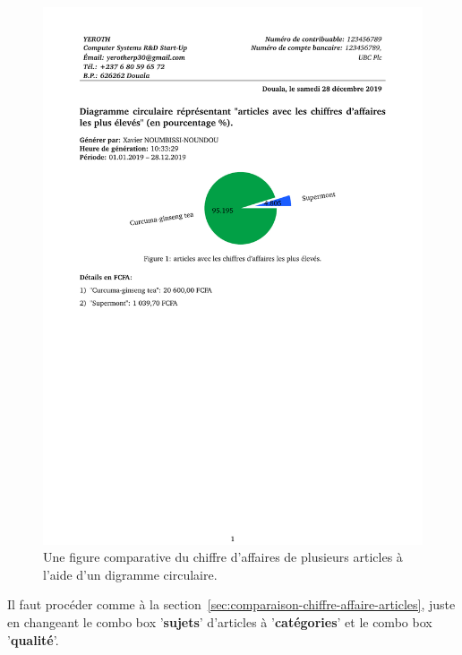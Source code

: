 \begin{figure}[!htbp]
	\centering
	\includegraphics[scale=0.65]{images/diagramme-circulaire-chiffre-daffaire-comparatif-articles.pdf}
	\caption{Une figure comparative du chiffre d'affaires de
		plusieurs articles \`a l'aide d'un digramme circulaire.}
	\label{fig:diagramme-circulaire-chiffre-daffaire-comparatif-articles}
\end{figure}


\newpage
{}

Il faut proc\'eder comme \`a la section~\ref{sec:comparaison-chiffre-affaire-articles}, juste
en changeant le combo box '\textbf{sujets}' d'articles \`a
'\textbf{cat\'egories}' et le combo box '\textbf{qualit\'e}'.

